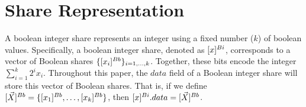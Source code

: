 \section{Share Representation}

A boolean integer share represents an integer using a fixed number ($k$) of boolean values. Specifically, a boolean integer share, denoted as 
$[x]^{Bi}$, corresponds to a vector of Boolean shares $\{[x_i]^{Bb}\}_{i=1,\ldots,k}$. Together, these bits encode the integer $\sum_{i=1}^{k}2^i x_i$. Throughout this paper, the $data$ field of a Boolean integer share will store this vector of Boolean shares. That is, if we define $[\vec{X}]^{Bb} = \{[x_1]^{Bb}, \ldots, [x_k]^{Bb}\}$, then $[x]^{Bi}.data = [\vec{X}]^{Bb}$.
